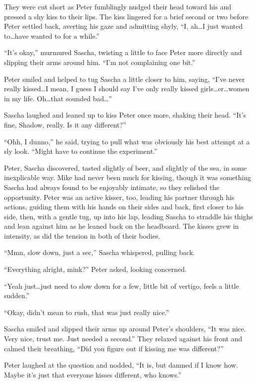 They were cut short as Peter fumblingly nudged their head toward his and pressed a shy kiss to their lips. The kiss lingered for a brief second or two before Peter settled back, averting his gaze and admitting shyly, ``I, ah\ldots{}I just wanted to\ldots{}have wanted to for a while.''

``It's okay,'' murmured Sascha, twisting a little to face Peter more directly and slipping their arms around him. ``I'm not complaining one bit.''

Peter smiled and helped to tug Sascha a little closer to him, saying, ``I've never really kissed\ldots{}I mean, I guess I should say I've only really kissed girls\ldots{}er\ldots{}women in my life. Oh\ldots{}that sounded bad\ldots{}''

Sascha laughed and leaned up to kiss Peter once more, shaking their head. ``It's fine, Shadow, really. Is it any different?''

``Ohh, I dunno,'' he said, trying to pull what was obviously his best attempt at a sly look. ``Might have to continue the experiment.''

Peter, Sascha discovered, tasted slightly of beer, and slightly of the sea, in some inexplicable way. Mike had never been much for kissing, though it was something Sascha had always found to be enjoyably intimate, so they relished the opportunity. Peter was an active kisser, too, leading his partner through his actions, guiding them with his hands on their sides and back, first closer to his side, then, with a gentle tug, up into his lap, leading Sascha to straddle his thighs and lean against him as he leaned back on the headboard. The kisses grew in intensity, as did the tension in both of their bodies.

``Mmn, slow down, just a sec,'' Sascha whispered, pulling back.

``Everything alright, mink?'' Peter asked, looking concerned.

``Yeah just\ldots{}just need to slow down for a few, little bit of vertigo, feels a little sudden.''

``Okay, didn't mean to rush, that was just really nice.''

Sascha smiled and slipped their arms up around Peter's shoulders, ``It was nice. Very nice, trust me. Just needed a second.'' They relaxed against his front and calmed their breathing, ``Did you figure out if kissing me was different?''

Peter laughed at the question and nodded, ``It is, but damned if I know how. Maybe it's just that everyone kisses different, who knows.''

